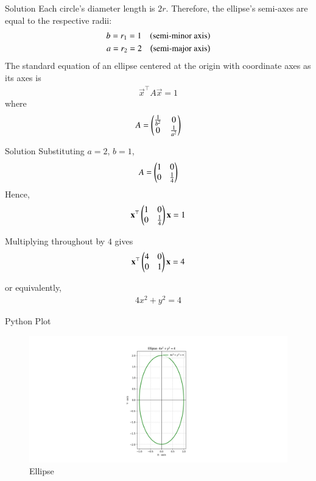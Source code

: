 \documentclass{beamer}
\begin{document}
\begin{frame}{Solution}
Each circle's diameter length is $2r$. Therefore, the ellipse's 
semi-axes are equal to the respective radii:
\begin{align}
    b = r_1 = 1 \quad \text{\ensuremath{\left(\text{semi-minor axis}\right)}}\\
    a = r_2 = 2 \quad \text{\ensuremath{\left(\text{semi-major axis}\right)}}
\end{align}
The standard equation of an ellipse centered at the origin with coordinate axes as its axes is
\begin{align}
    \vec{x}^\top A \vec{x} = 1
\end{align}
where
\begin{align}
    A = \begin{pmatrix}\frac{1}{b^2} & 0 \\ 0 & \frac{1}{a^2}\end{pmatrix}
\end{align}
\end{frame}

\begin{frame}{Solution}
Substituting $a = 2,\, b = 1$,
\begin{align}
    A = \begin{pmatrix}1 & 0 \\ 0 & \frac{1}{4}\end{pmatrix}
\end{align}
Hence,
\begin{align}
    \mathbf{x}^\top\begin{pmatrix}1 & 0 \\ 0 & \frac{1}{4}\end{pmatrix}\mathbf{x} = 1
\end{align}

Multiplying throughout by $4$ gives
\begin{align}
    \mathbf{x}^\top\begin{pmatrix}4 & 0 \\ 0 & 1\end{pmatrix}\mathbf{x} = 4
\end{align}

or equivalently,
\begin{align}
    4x^2 + y^2 = 4
\end{align}
\end{frame}
\begin{frame}{Python Plot}
    \begin{figure}
        \centering
        \includegraphics[width=\columnwidth]{../figs/figure_py.png}
        \caption{Ellipse}
        \label{fig:fig}
    \end{figure}
\end{frame}
\end{document}
